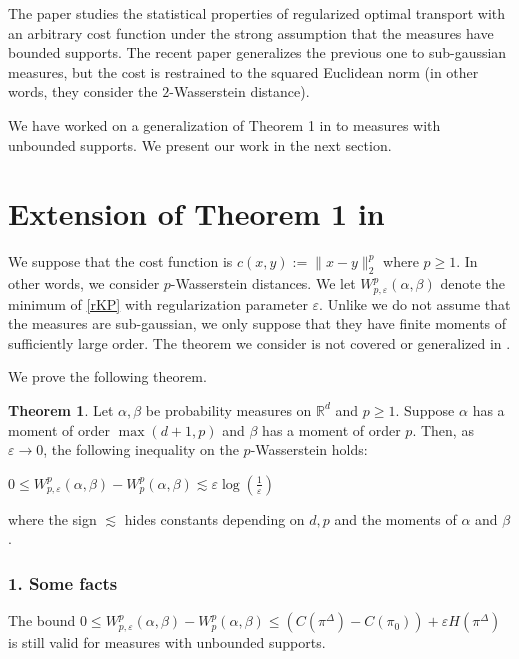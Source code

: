 \documentclass[12pt]{report}
\theoremstyle{definition}
\newtheorem*{thm*}{Theorem}
\theoremstyle{remark}
\begin{document}
\par The paper \cite{genevay2018sample} studies the statistical properties of regularized optimal transport with an arbitrary cost function under the strong assumption that the measures have bounded supports. The recent paper \cite{mena2019statistical} generalizes the previous one to sub-gaussian measures, but the cost is restrained to the squared Euclidean norm (in other words, they consider the $2$-Wasserstein distance).

\par We have worked on a generalization of Theorem 1 in \cite{genevay2018sample} to measures with unbounded supports. We present our work in the next section.

\newpage
\section{Extension of Theorem 1 in \cite{genevay2018sample}}

\hspace{\parindent} We suppose that the cost function is $c(x,y):= \|x-y\|_2^p$ where $p\geq 1$. In other words, we consider $p$-Wasserstein distances. We let $W_{p,\varepsilon}^p(\alpha, \beta)$ denote the minimum of \ref{rKP} with regularization parameter $\varepsilon$. Unlike \cite{mena2019statistical} we do not assume that the measures are sub-gaussian, we only suppose that they have finite moments of sufficiently large order. The theorem we consider is not covered or generalized in \cite{mena2019statistical}.

We prove the following theorem.
\begin{thm*}
	Let $\alpha,\beta$ be probability measures on $\mathbb R^d$ and $p\geq 1$. Suppose $\alpha$ has a moment of order $\max(d+1,p)$ and $\beta$ has a moment of order $p$. Then, as $\varepsilon\to 0$, the following inequality on the $p$-Wasserstein holds: 
	\begin{center}
		$0 \leqslant W_{p,\varepsilon}^p(\alpha, \beta)-W_p^p(\alpha, \beta) \lesssim \varepsilon \log\left(\frac 1{\varepsilon} \right)$
	\end{center}
	where the sign $\lesssim$ hides constants depending on $d, p$ and the moments of $\alpha$ and $\beta$.
\end{thm*}

\subsubsection*{1. Some facts}
\hspace{\parindent}The bound $0 \leqslant W_{p,\varepsilon}^p(\alpha, \beta)-W_p^p(\alpha, \beta) \leqslant\left(C(\pi^{\Delta})-C(\pi_{0})\right)+\varepsilon H(\pi^{\Delta})$ is still valid for measures with unbounded supports. 
\end{document}
